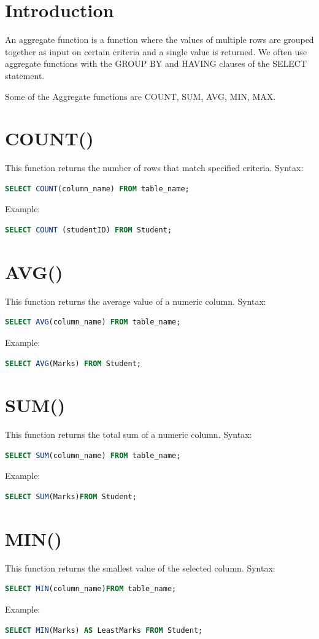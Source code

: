 \section{Introduction}
An aggregate function is a function where the values of multiple rows are grouped together as input on certain criteria and a single value is returned. We often use aggregate functions with the GROUP BY and HAVING clauses of the SELECT statement.

Some of the Aggregate functions are COUNT, SUM, AVG, MIN, MAX.

\section{COUNT()}
This function returns the number of rows that match specified criteria.
Syntax:
\begin{lstlisting}[language=sql]
	SELECT COUNT(column_name) FROM table_name;
\end{lstlisting}
Example:
\begin{lstlisting}[language=sql]
	SELECT COUNT (studentID) FROM Student;
\end{lstlisting}

\section{AVG()}
This function returns the average value of a numeric column.
Syntax:
\begin{lstlisting}[language=sql]
	SELECT AVG(column_name) FROM table_name;
\end{lstlisting}
Example:
\begin{lstlisting}[language=sql]
	SELECT AVG(Marks) FROM Student;
\end{lstlisting}

\section{SUM()}
This function returns the total sum of a numeric column.
Syntax:
\begin{lstlisting}[language=sql]
	SELECT SUM(column_name) FROM table_name;
\end{lstlisting}
Example:
\begin{lstlisting}[language=sql]
	SELECT SUM(Marks)FROM Student;
\end{lstlisting}

\section{MIN()}
This function returns the smallest value of the selected column.
Syntax:
\begin{lstlisting}[language=sql]
	SELECT MIN(column_name)FROM table_name;
\end{lstlisting}
Example:
\begin{lstlisting}[language=sql]
	SELECT MIN(Marks) AS LeastMarks FROM Student;
\end{lstlisting}

